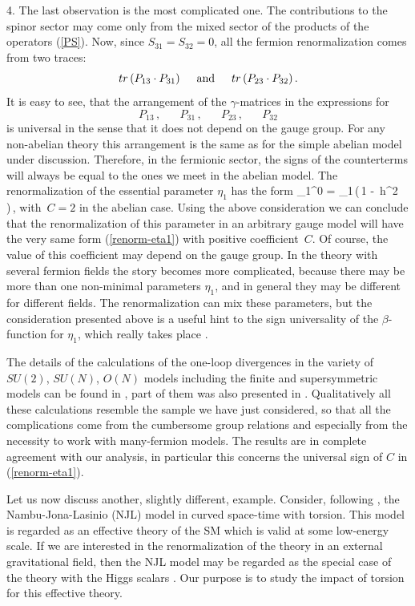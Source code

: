 4. The last observation is the most complicated one. The 
contributions to the spinor sector may come only from the 
mixed sector of the products of the operators (\ref{PS}).
Now, since $S_{31}=S_{32}=0$, 
all the fermion renormalization comes from two traces: 
$$
tr\,(P_{13}\cdot P_{31}) \,\,\,\,\,\,\,\,\, {\rm and}                
\,\,\,\,\,\,\,\,\, tr\,(P_{23}\cdot P_{32}) \,.
$$
It is easy to see, that the arrangement of the 
$\gamma$-matrices in the expressions for  
$$
P_{13}\,,\,\,\,\,\,\,\,\,\,\,  P_{31}\,,\,\,\,\,\,\,\,\,\,\,  
P_{23}\,,\,\,\,\,\,\,\,\,\,\,  P_{32}
$$
is universal in the sense that it does not depend on the 
gauge group. For any non-abelian theory 
this arrangement is the same as for the simple abelian 
model under discussion. Therefore, in the fermionic sector,
the signs of the counterterms will always be equal to the 
ones we meet in the abelian model. The renormalization of the 
essential parameter $\eta_1$ has the form
\beq
\eta_1^0 = \eta_1\,\left(\,1 - \,h^2\, \right)\,,
\label{renorm-eta1}
\eeq
with $\,C=2$ in the abelian case.
Using the above consideration we can conclude that the
renormalization of this parameter in an arbitrary 
gauge model will have the very same form (\ref{renorm-eta1}) 
with positive coefficient $\,C$. Of course, the value of 
this coefficient may depend on the gauge group. In 
the theory with several fermion fields the story becomes
more complicated, because there may be 
more than one non-minimal parameters $\eta_1$, and in 
general they may be different for different fields. The 
renormalization can mix these parameters, but the 
consideration presented above is a useful hint to the
sign universality of the $\beta$-function for $\eta_1$, 
which really takes place \cite{bush1,bush2,bush-Izv,sh-alexeev}. 

The details of the
calculations of the one-loop divergences in the variety
of $SU(2)$, $SU(N)$, $O(N)$ models including the finite
and supersymmetric models can be found in 
\cite{bush1,bush2,bush-Izv,sh-alexeev}, part of them was 
also presented in \cite{book}. Qualitatively
all these calculations resemble the sample we have 
just considered, so that all the complications come from the 
cumbersome group relations and especially from the 
necessity to work with many-fermion models. The results
are in complete agreement with our analysis, in particular
this concerns the universal sign of $C$ in (\ref{renorm-eta1}).

Let us now discuss another, slightly different, example.
Consider, following  \cite{njl}, the Nambu-Jona-Lasinio (NJL) 
model in curved space-time with torsion. 
This model is regarded as an effective theory of the SM
which is valid at some low-energy scale. If we are 
interested in the renormalization of the theory in 
an external gravitational field, then the NJL model may be 
regarded as the special case of the theory with
the  Higgs scalars \cite{hill&Salopek,mutodi}.
Our purpose is to study the impact of torsion 
for this effective theory.

